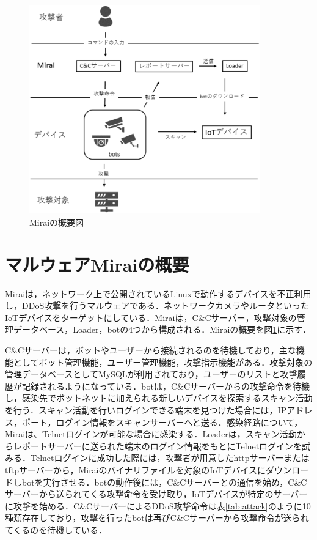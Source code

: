 \begin{figure}[h]
   \centering
      \includegraphics[width=100mm]{figures/s.eps}
      \caption{Miraiの概要図}
   \label{fig:Mirai_system}   
\end{figure}

 

\section{マルウェアMiraiの概要}

Miraiは，ネットワーク上で公開されているLinuxで動作するデバイスを不正利用し，DDoS攻撃を行うマルウェアである．ネットワークカメラやルータといったIoTデバイスをターゲットにしている．Miraiは，C\&Cサーバー，攻撃対象の管理データベース，Loader，botの4つから構成される．Miraiの概要を図\ref{fig:Mirai_system}に示す．


C\&Cサーバーは，ボットやユーザーから接続されるのを待機しており，主な機能としてボット管理機能，ユーザー管理機能，攻撃指示機能がある．攻撃対象の管理データベースとしてMySQLが利用されており，ユーザーのリストと攻撃履歴が記録されるようになっている．botは，C\&Cサーバーからの攻撃命令を待機し，感染先でボットネットに加えられる新しいデバイスを探索するスキャン活動を行う．スキャン活動を行いログインできる端末を見つけた場合には，IPアドレス，ポート，ログイン情報をスキャンサーバーへと送る．感染経路について，Miraiは、Telnetログインが可能な場合に感染する．Loaderは，スキャン活動からレポートサーバーに送られた端末のログイン情報をもとにTelnetログインを試みる．Telnetログインに成功した際には，攻撃者が用意したhttpサーバーまたはtftpサーバーから，Miraiのバイナリファイルを対象のIoTデバイスにダウンロードしbotを実行させる．botの動作後には，C\&Cサーバーとの通信を始め，C\&Cサーバーから送られてくる攻撃命令を受け取り，IoTデバイスが特定のサーバーに攻撃を始める．C\&CサーバーによるDDoS攻撃命令は表\ref{tab:attack}のように10種類存在しており，攻撃を行ったbotは再びC\&Cサーバーから攻撃命令が送られてくるのを待機している．


